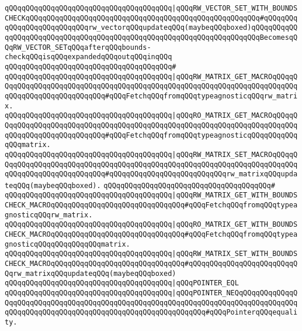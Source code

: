 \verb|qQQqqQQqqQQqqQQqqQQqqQQqqQQqqQQqqQQqqQQq|\verb#|qQQqRW_VECTOR_SET_WITH_BOUNDSCHECKqQQqqQQqqQQqqQQqqQQqqQQqqQQqqQQqqQQqqQQqqQQqqQQqqQQqqQQq#\verb|#qQQqqQQqqQQqqQQqqQQqqQQqqQQqrw_vectorqQQqupdateqQQq(maybeqQQqboxed)qQQqqQQqqQQqqQQqqQQqqQQqqQQqqQQqqQQqqQQqqQQqqQQqqQQqqQQqqQQqqQQqqQQqqQQqBecomesqQQqRW_VECTOR_SETqQQqafterqQQqbounds-checkqQQqisqQQqexpandedqQQqoutqQQqinqQQq|\newline
\verb|qQQqqQQqqQQqqQQqqQQqqQQqqQQqqQQqqQQqqQQq#|\newline
\verb|qQQqqQQqqQQqqQQqqQQqqQQqqQQqqQQqqQQqqQQq|\verb#|qQQqRW_MATRIX_GET_MACROqQQqqQQqqQQqqQQqqQQqqQQqqQQqqQQqqQQqqQQqqQQqqQQqqQQqqQQqqQQqqQQqqQQqqQQqqQQqqQQqqQQqqQQqqQQqqQQqqQQq#\verb|#qQQqFetchqQQqfromqQQqtypeagnosticqQQqrw_matrix.|\newline
\verb|qQQqqQQqqQQqqQQqqQQqqQQqqQQqqQQqqQQqqQQq|\verb#|qQQqRO_MATRIX_GET_MACROqQQqqQQqqQQqqQQqqQQqqQQqqQQqqQQqqQQqqQQqqQQqqQQqqQQqqQQqqQQqqQQqqQQqqQQqqQQqqQQqqQQqqQQqqQQqqQQqqQQq#\verb|#qQQqFetchqQQqfromqQQqtypeagnosticqQQqqQQqqQQqqQQqmatrix.|\newline
\verb|qQQqqQQqqQQqqQQqqQQqqQQqqQQqqQQqqQQqqQQq|\verb#|qQQqRW_MATRIX_SET_MACROqQQqqQQqqQQqqQQqqQQqqQQqqQQqqQQqqQQqqQQqqQQqqQQqqQQqqQQqqQQqqQQqqQQqqQQqqQQqqQQqqQQqqQQqqQQqqQQqqQQq#\verb|#qQQqqQQqqQQqqQQqqQQqqQQqqQQqrw_matrixqQQqupdateqQQq(maybeqQQqboxed).|\newline
\verb|qQQqqQQqqQQqqQQqqQQqqQQqqQQqqQQqqQQqqQQq#|\newline
\verb|qQQqqQQqqQQqqQQqqQQqqQQqqQQqqQQqqQQqqQQq|\verb#|qQQqRW_MATRIX_GET_WITH_BOUNDSCHECK_MACROqQQqqQQqqQQqqQQqqQQqqQQqqQQqqQQq#\verb|#qQQqFetchqQQqfromqQQqtypeagnosticqQQqrw_matrix.|\newline
\verb|qQQqqQQqqQQqqQQqqQQqqQQqqQQqqQQqqQQqqQQq|\verb#|qQQqRO_MATRIX_GET_WITH_BOUNDSCHECK_MACROqQQqqQQqqQQqqQQqqQQqqQQqqQQqqQQq#\verb|#qQQqFetchqQQqfromqQQqtypeagnosticqQQqqQQqqQQqqQQqmatrix.|\newline
\verb|qQQqqQQqqQQqqQQqqQQqqQQqqQQqqQQqqQQqqQQq|\verb#|qQQqRW_MATRIX_SET_WITH_BOUNDSCHECK_MACROqQQqqQQqqQQqqQQqqQQqqQQqqQQqqQQq#\verb|#qQQqqQQqqQQqqQQqqQQqqQQqqQQqrw_matrixqQQqupdateqQQq(maybeqQQqboxed)|\newline
\newline
\verb|qQQqqQQqqQQqqQQqqQQqqQQqqQQqqQQqqQQqqQQq|\verb#|qQQqPOINTER_EQL#\newline
\verb|qQQqqQQqqQQqqQQqqQQqqQQqqQQqqQQqqQQqqQQq|\verb#|qQQqPOINTER_NEQqQQqqQQqqQQqqQQqqQQqqQQqqQQqqQQqqQQqqQQqqQQqqQQqqQQqqQQqqQQqqQQqqQQqqQQqqQQqqQQqqQQqqQQqqQQqqQQqqQQqqQQqqQQqqQQqqQQqqQQqqQQqqQQqqQQq#\verb|#qQQqPointerqQQqequality.|\newline
